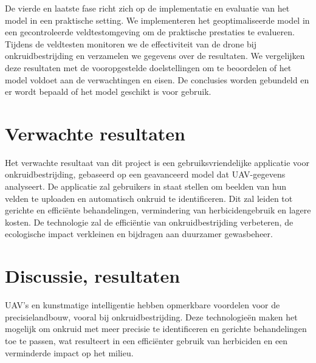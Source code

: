 \documentclass{hogent-article}
\begin{document}
De vierde en laatste fase richt zich op de implementatie en evaluatie van het model in een praktische setting. We implementeren het geoptimaliseerde model in een gecontroleerde veldtestomgeving om de praktische prestaties te evalueren. Tijdens de veldtesten monitoren we de effectiviteit van de drone bij onkruidbestrijding en verzamelen we gegevens over de resultaten. We vergelijken deze resultaten met de vooropgestelde doelstellingen om te beoordelen of het model voldoet aan de verwachtingen en eisen. De conclusies worden gebundeld en er wordt bepaald of het model geschikt is voor gebruik.

%
%
%

\section{Verwachte resultaten}%
\label{sec:verwachte-resultaten}


Het verwachte resultaat van dit project is een gebruiksvriendelijke applicatie voor onkruidbestrijding, gebaseerd op een geavanceerd model dat UAV-gegevens analyseert. De applicatie zal gebruikers in staat stellen om beelden van hun velden te uploaden en automatisch onkruid te identificeren. Dit zal leiden tot gerichte en efficiënte behandelingen, vermindering van herbicidengebruik en lagere kosten. De technologie zal de efficiëntie van onkruidbestrijding verbeteren, de ecologische impact verkleinen en bijdragen aan duurzamer gewasbeheer.
\section{Discussie, resultaten}%
\label{sec:Discussie, resultaten}

UAV's en kunstmatige intelligentie hebben opmerkbare voordelen voor de precisielandbouw, vooral bij onkruidbestrijding. Deze technologieën maken het mogelijk om onkruid met meer precisie te identificeren en gerichte behandelingen toe te passen, wat resulteert in een efficiënter gebruik van herbiciden en een verminderde impact op het milieu.
\end{document}
